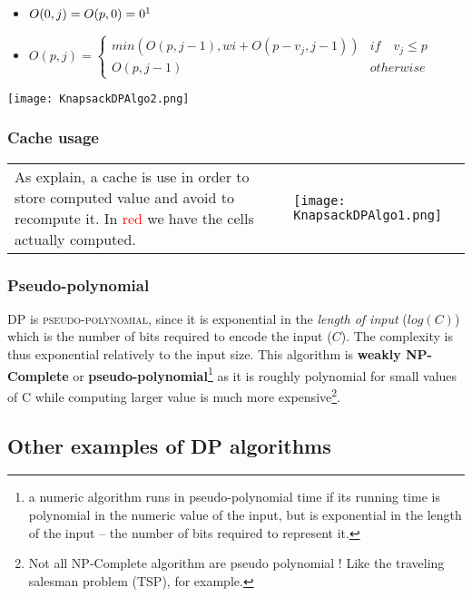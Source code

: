 \begin{itemize}
    \begin{itemize}
    \item $O(0,j) = O(p,0) = 0 \text{\footnotemark} $
    \item $ O(p,j) = \begin{cases}
                min(O(p,j-1), wi + O(p-v_j,j-1)) & if \quad v_j \leq p \\
                O(p,j-1) & otherwise
            \end{cases}$
        \end{itemize}
        \begin{center}
            \texttt{[image: KnapsackDPAlgo2.png]}
        \end{center}
\end{itemize}

\subsubsection{Cache usage}
\begin{tabular}{m{9cm}m{6cm}}
As explain, a cache is use in order to store computed value and avoid to recompute
it. In \textcolor{red}{red} we have the cells actually computed.
&
    \texttt{[image: KnapsackDPAlgo1.png]}
\end{tabular}


\subsubsection{Pseudo-polynomial}

DP is \textsc{pseudo-polynomial}, since it is exponential in the 
\textit{length of input} ($log(C)$) which is the number of bits required to
encode the input ($C$). The complexity is thus exponential relatively to the
input size. This algorithm is \textbf{weakly NP-Complete} or
\textbf{pseudo-polynomial}\footnote{a numeric algorithm runs in
pseudo-polynomial time if its running time is polynomial in the numeric value
of the input, but is exponential in the length of the input – the number of
bits required to represent it.} as it is roughly polynomial for small values of
C while computing larger value is much more expensive\footnote{Not all
    NP-Complete algorithm are pseudo polynomial ! Like the traveling salesman
problem (TSP), for example.}.


\subsection{Other examples of DP algorithms}

